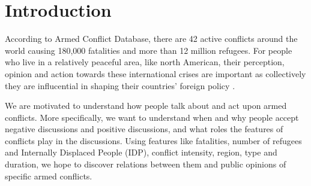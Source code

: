 \section{Introduction}
According to Armed Conflict Database, there are 42 active conflicts around the world causing 180,000 fatalities and more than 12 million refugees. For people who live in a relatively peaceful area, like north American, their perception, opinion and action towards these international crises are important as collectively they are influcential in shaping their countries' foreign policy \cite{Gelpi2009}. 

We are motivated to understand how people talk about and act upon armed conflicts. More specifically, we want to understand when and why people accept negative discussions and positive discussions, and what roles the features of conflicts play in the discussions. Using features like fatalities, number of refugees and Internally Displaced People (IDP), conflict intensity, region, type and duration, we hope to discover relations between them and public opinions of specific armed conflicts.